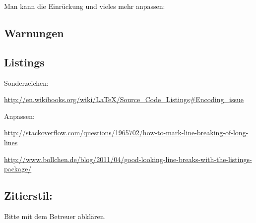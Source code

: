 Man kann die Einrückung und vieles mehr anpassen:

\begin{Shaded}
\end{Shaded}

\hypertarget{warnungen}{%
\subsection{Warnungen}\label{warnungen}}

\begin{Shaded}
\end{Shaded}

\hypertarget{listings}{%
\subsection{Listings}\label{listings}}

Sonderzeichen:

\url{http://en.wikibooks.org/wiki/LaTeX/Source_Code_Listings\#Encoding_issue}

Anpassen:

\url{http://stackoverflow.com/questions/1965702/how-to-mark-line-breaking-of-long-lines}

\url{http://www.bollchen.de/blog/2011/04/good-looking-line-breaks-with-the-listings-package/}

\hypertarget{zitierstil}{%
\subsection{Zitierstil:}\label{zitierstil}}

Bitte mit dem Betreuer abklären.

